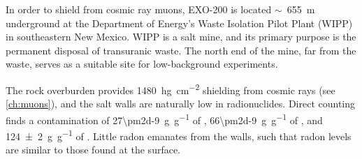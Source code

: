 \documentclass[herrin-thesis.tex]{subfiles}
\begin{document}
In order to shield from cosmic ray muons, EXO-200 is located \(\sim\)~\SI{655}{\m} underground at the Department of Energy's Waste Isolation Pilot Plant (WIPP) in southeastern New Mexico. WIPP is a salt mine, and its primary purpose is the permanent disposal of transuranic waste. The north end of the mine, far from the waste, serves as a suitable site for low-background experiments.

The rock overburden provides \SI{1480}{\hecto\g\per\square\cm} shielding from cosmic rays (see \cref{ch:muons}), and the salt walls are naturally low in radionuclides. Direct counting finds a contamination of \SI[per-mode=symbol]{27\pm2d-9}{\g\per\g} of , \SI[per-mode=symbol]{66\pm2d-9}{\g\per\g} of , and \SI[per-mode=symbol]{124\pm2}{\g\per\g} of \cite{Auger:2012dq}. Little radon emanates from the walls, such that radon levels are similar to those found at the surface.
\end{document}
